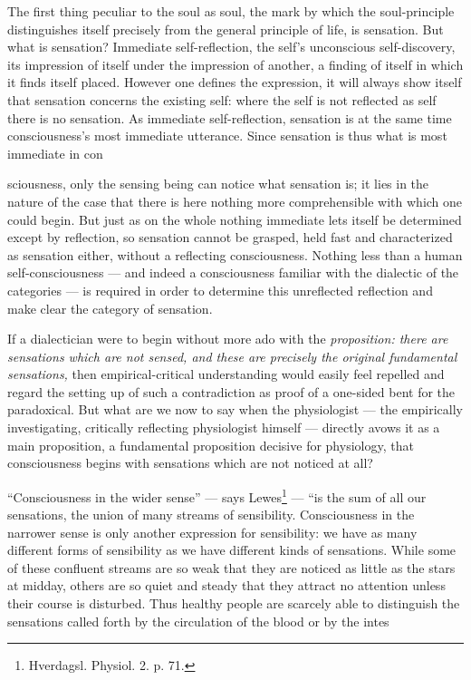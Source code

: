 \documentclass[12pt,a4paper]{book}
\begin{document}
The first thing peculiar to the soul as soul, the mark by which the soul-principle
distinguishes itself precisely from the general principle of life, is sensation.
But what is sensation? Immediate self-reflection, the self's unconscious
self-discovery, its impression of itself under the impression of another, a finding
of itself in which it finds itself placed. However one defines the expression, it
will always show itself that sensation concerns the existing self: where the self
is not reflected as self there is no sensation. As immediate self-reflection,
sensation is at the same time consciousness's most immediate utterance. Since
sensation is thus what is most immediate in con%

\setcounter{footnote}{0}%
sciousness, only the sensing being can notice what sensation is; it lies in the
nature of the case that there is here nothing more comprehensible with which one
could begin. But just as on the whole nothing immediate lets itself be determined
except by reflection, so sensation cannot be grasped, held fast and characterized
as sensation either, without a reflecting consciousness. Nothing less than a human
self-consciousness --- and indeed a consciousness familiar with the dialectic of
the categories --- is required in order to determine this unreflected reflection
and make clear the category of sensation.

If a dialectician were to begin without more ado with the \emph{proposition: there
are sensations which are not sensed, and these are precisely the original
fundamental sensations,} then empirical-critical understanding would easily feel
repelled and regard the setting up of such a contradiction as proof of a one-sided
bent for the paradoxical. But what are we now to say when the physiologist --- the
empirically investigating, critically reflecting physiologist himself --- directly
avows it as a main proposition, a fundamental proposition decisive for physiology,
that consciousness begins with sensations which are not noticed at all?

``Consciousness in the wider sense'' --- says Lewes\footnote{Hverdagsl. Physiol. 2.
p. 71.} --- ``is the sum of all our sensations, the union of many streams of
sensibility. Consciousness in the narrower sense is only another expression for
sensibility: we have as many different forms of sensibility as we have different
kinds of sensations. While some of these confluent streams are so weak that they
are noticed as little as the stars at midday, others are so quiet and steady that
they attract no attention unless their course is disturbed. Thus healthy people are
scarcely able to distinguish the sensations called forth by the circulation of the
blood or by the intes%
\end{document}
